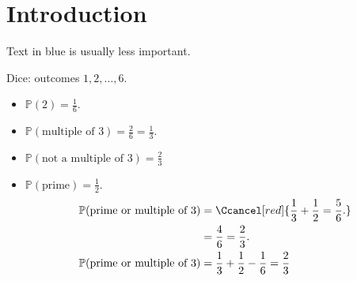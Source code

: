 \section{Introduction}
Text in blue is usually less important.

\begin{example} \label{exm:0}
    Dice: outcomes $1, 2, \dots, 6$.
    \begin{itemize}
        \item $\mathbb{P}(2) = \frac{1}{6}.$
        \item $\mathbb{P}(\text{multiple of }3) = \frac{2}{6} = \frac{1}{3}.$
        \item $\mathbb{P}(\text{not a multiple of }3) = \frac{2}{3}$
        \item $\mathbb{P}(\text{prime}) = \frac{1}{2}.$
        \mathitem \begin{align*}
            \mathbb{P}(\text{prime or multiple of 3}) &= \Ccancel[red]{\frac{1}{3} + \frac{1}{2} = \frac{5}{6}.} \\
            &= \frac{4}{6} = \frac{2}{3}. \\
            \mathbb{P}(\text{prime or multiple of 3}) &= \frac{1}{3} + \frac{1}{2} - \frac{1}{6} = \frac{2}{3}
        \end{align*} 
    \end{itemize} 
\end{example}